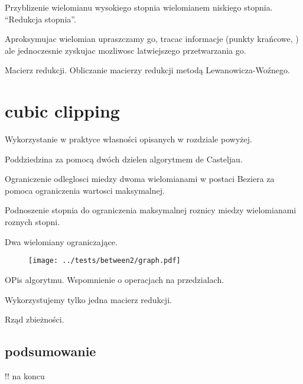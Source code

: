 \documentclass[11pt,a4paper,oneside]{report}
\begin{document}
Przyblizenie wielomianu wysokiego stopnia wielomianem niskiego stopnia. ``Redukcja stopnia''. 

Aproksymujac wielomian upraszczamy go, tracac informacje (punkty krańcowe, ) ale jednoczesnie zyskujac mozliwosc latwiejszego przetwarzania go.

Macierz redukcji. Obliczanie macierzy redukcji metodą Lewanowicza-Woźnego.

\section{cubic clipping}

Wykorzystanie w praktyce własności opisanych w rozdziale powyżej.

Poddziedzina za pomocą dwóch dzielen algorytmem de Casteljau.

Ograniczenie odleglosci miedzy dwoma wielomianami w postaci Beziera za pomoca ograniczenia wartosci maksymalnej.

Podnoszenie stopnia do ograniczenia maksymalnej roznicy miedzy wielomianami roznych stopni.

Dwa wielomiany ograniczające.

\begin{center}
  \begin{figure}
    \texttt{[image: ../tests/between2/graph.pdf]}
  \end{figure}
\end{center}



OPis algorytmu. Wspomnienie o operacjach na przedzialach.

Wykorzystujemy tylko jedna macierz redukcji.

Rząd zbieżności.

\subsection{podsumowanie}

!! na koncu
\end{document}
